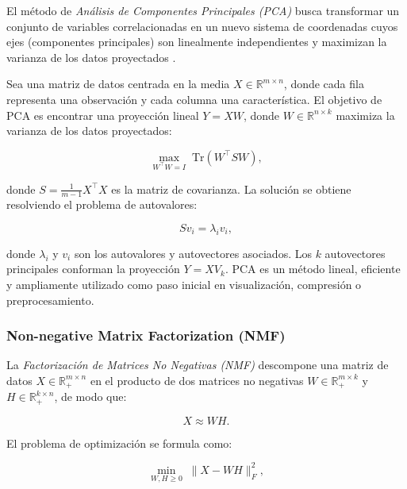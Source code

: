 \documentclass[conference]{IEEEtran}
\begin{document}
El método de \textit{Análisis de Componentes Principales (PCA)} busca transformar un conjunto de variables correlacionadas en un nuevo sistema de coordenadas cuyos ejes (componentes principales) son linealmente independientes y maximizan la varianza de los datos proyectados \cite{jolliffe2016principal}. 

Sea una matriz de datos centrada en la media $X \in \mathbb{R}^{m \times n}$, donde cada fila representa una observación y cada columna una característica. El objetivo de PCA es encontrar una proyección lineal $Y = XW$, donde $W \in \mathbb{R}^{n \times k}$ maximiza la varianza de los datos proyectados:

\begin{equation}
\max_{W^\top W = I} \; \mathrm{Tr}(W^\top S W),
\end{equation}

donde $S = \frac{1}{m-1} X^\top X$ es la matriz de covarianza.  
La solución se obtiene resolviendo el problema de autovalores:

\begin{equation}
S v_i = \lambda_i v_i,
\end{equation}

donde $\lambda_i$ y $v_i$ son los autovalores y autovectores asociados. Los $k$ autovectores principales conforman la proyección $Y = X V_k$.  
PCA es un método lineal, eficiente y ampliamente utilizado como paso inicial en visualización, compresión o preprocesamiento.

\subsubsection{Non-negative Matrix Factorization (NMF)}

La \textit{Factorización de Matrices No Negativas (NMF)} descompone una matriz de datos $X \in \mathbb{R}_{+}^{m \times n}$ en el producto de dos matrices no negativas $W \in \mathbb{R}_{+}^{m \times k}$ y $H \in \mathbb{R}_{+}^{k \times n}$, de modo que:

\begin{equation}
X \approx WH.
\end{equation}

El problema de optimización se formula como:

\begin{equation}
\min_{W, H \geq 0} \; \|X - WH\|_F^2,
\end{equation}
\end{document}
